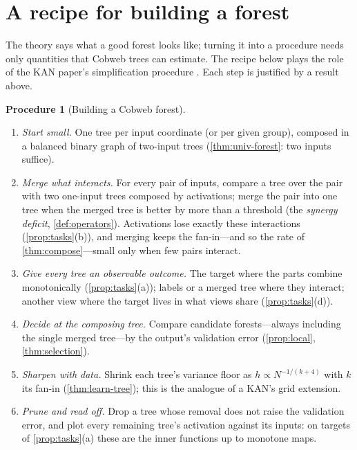\documentclass[11pt]{article}
\theoremstyle{definition}
\newtheorem{procedure}[theorem]{Procedure}
\theoremstyle{remark}
\begin{document}
\section{A recipe for building a forest}\label{sec:recipe}

The theory says what a good forest looks like; turning it into a procedure needs only
quantities that Cobweb trees can estimate.  The recipe below plays the role of the KAN
paper's simplification procedure \citep{liu2024kan}.  Each step is justified by a result
above.

\begin{procedure}[Building a Cobweb forest]\label{proc:recipe}
\leavevmode
\begin{enumerate}[leftmargin=*]
\item \emph{Start small.}  One tree per input coordinate (or per given group), composed in
  a balanced binary graph of two-input trees (\cref{thm:univ-forest}: two inputs suffice).
\item \emph{Merge what interacts.}  For every pair of inputs, compare a tree over the pair
  with two one-input trees composed by activations; merge the pair into one tree when the
  merged tree is better by more than a threshold (the \emph{synergy deficit},
  \cref{def:operators}).  Activations lose exactly these interactions
  (\cref{prop:tasks}(b)), and merging keeps the fan-in---and so the rate of
  \cref{thm:compose}---small only when few pairs interact.
\item \emph{Give every tree an observable outcome.}  The target where the parts combine
  monotonically (\cref{prop:tasks}(a)); labels or a merged tree where they interact; another
  view where the target lives in what views share (\cref{prop:tasks}(d)).
\item \emph{Decide at the composing tree.}  Compare candidate forests---always including
  the single merged tree---by the output's validation error (\cref{prop:local},
  \cref{thm:selection}).
\item \emph{Sharpen with data.}  Shrink each tree's variance floor as
  $h\propto N^{-1/(k+4)}$ with $k$ its fan-in (\cref{thm:learn-tree}); this is the analogue of
  a KAN's grid extension.
\item \emph{Prune and read off.}  Drop a tree whose removal does not raise the validation
  error, and plot every remaining tree's activation against its inputs: on targets of
  \cref{prop:tasks}(a) these are the inner functions up to monotone maps.
\end{enumerate}
\end{procedure}
\end{document}

